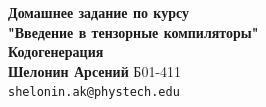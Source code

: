 

\graphicspath{{img/}}



\begin{center}
    {\Large \textbf{Домашнее задание по курсу \\ "Введение в тензорные компиляторы"}} \\[0.3cm]
    {\large \textbf{Кодогенерация}} \\[1cm]
    
    \textbf{Шелонин Арсений} Б01-411 \\
    \texttt{shelonin.ak@phystech.edu}
\end{center}

\tableofcontents
\newpage


